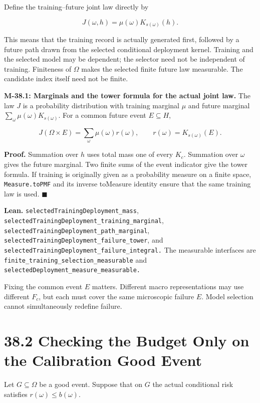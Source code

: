 \documentclass[
  english,
  11pt,
  oneside]{book}
\begin{document}
Define the training--future joint law directly by

\[J(\omega,h)=\mu(\omega)K_{s(\omega)}(h).\]

This means that the training record is actually generated first, followed by a future path drawn from the selected conditional deployment kernel. Training and the selected model may be dependent; the selector need not be independent of training. Finiteness of \(\Omega\) makes the selected finite future law measurable. The candidate index itself need not be finite.

\hypertarget{m-38-1}{}\label{m-38-1}

\textbf{M-38.1: Marginals and the tower formula for the actual joint law.} The law \(J\) is a probability distribution with training marginal \(\mu\) and future marginal \(\sum_\omega\mu(\omega)K_{s(\omega)}\). For a common future event \(E\subseteq H\),

\[J(\Omega\times E)
=\sum_\omega\mu(\omega)r(\omega),
\qquad r(\omega)=K_{s(\omega)}(E).\]

\textbf{Proof.} Summation over \(h\) uses total mass one of every \(K_c\). Summation over \(\omega\) gives the future marginal. Two finite sums of the event indicator give the tower formula. If training is originally given as a probability measure on a finite space, \nolinkurl{Measure.toPMF} and its inverse toMeasure identity ensure that the same training law is used. \(\blacksquare\)

\textbf{Lean.} \nolinkurl{selectedTrainingDeployment_mass}, \nolinkurl{selectedTrainingDeployment_training_marginal}, \nolinkurl{selectedTrainingDeployment_path_marginal}, \nolinkurl{selectedTrainingDeployment_failure_tower}, and \nolinkurl{selectedTrainingDeployment_failure_integral.} The measurable interfaces are \nolinkurl{finite_training_selection_measurable} and \nolinkurl{selectedDeployment_measure_measurable.}

Fixing the common event \(E\) matters. Different macro representations may use different \(F_c\), but each must cover the same microscopic failure \(E\). Model selection cannot simultaneously redefine failure.

\section{38.2 Checking the Budget Only on the Calibration Good Event}\label{checking-the-budget-only-on-the-calibration-good-event}

Let \(G\subseteq\Omega\) be a good event. Suppose that on \(G\) the actual conditional risk satisfies \(r(\omega)\le b(\omega)\).
\end{document}
